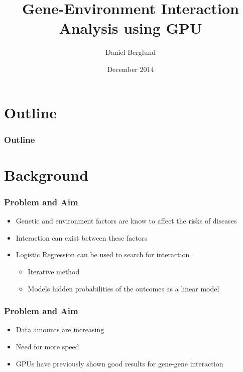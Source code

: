\documentclass{beamer}
\title{Gene-Environment Interaction Analysis using GPU}
\author{Daniel Berglund}
\date{December 2014}
\begin{document}
\begin{frame}
 \titlepage
\end{frame}

\section*{Outline}
\begin{frame}
\frametitle{Outline}
 \tableofcontents
\end{frame}

\section{Background}

\begin{frame}
\frametitle{Problem and Aim}

\begin{itemize}
 \item Genetic and environment factors are know to affect the risks of diseases
 \item Interaction can exist between these factors
 \item Logistic Regression can be used to search for interaction
\begin{itemize}
 \item Iterative method
 \item Models hidden probabilities of the outcomes as a linear model
\end{itemize}
\end{itemize}

\end{frame}

\begin{frame}
\frametitle{Problem and Aim}

\begin{itemize}
 \item Data amounts are increasing
 \item Need for more speed
 \item GPUs have previously shown good results for gene-gene interaction
\end{itemize}

\end{frame}

 
\end{document}

